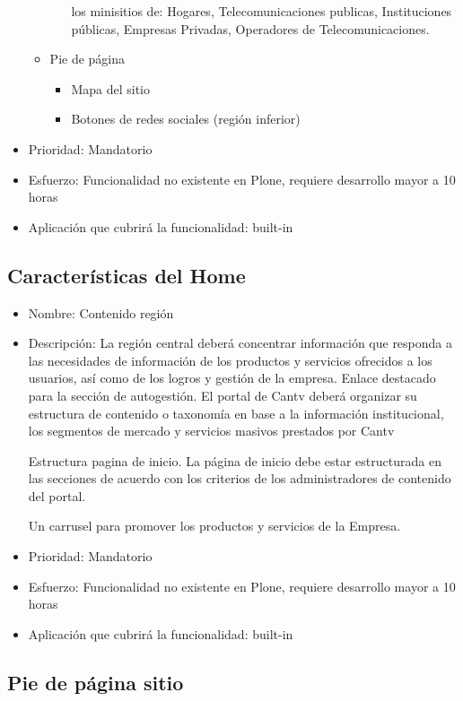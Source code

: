 \documentclass[11pt, letterpaper, oneside, spanish]{scrbook}
\begin{document}
\begin{itemize}
\begin{itemize}
\begin{itemize}
       los minisitios de: Hogares, Telecomunicaciones publicas, Instituciones
       públicas, Empresas Privadas, Operadores de Telecomunicaciones.
\end{itemize}
\item Pie de página
\begin{itemize}
\item Mapa del sitio
\item Botones de redes sociales (región inferior)
\end{itemize}
\end{itemize}
\item Prioridad: Mandatorio
\item Esfuerzo: Funcionalidad no existente en Plone, requiere desarrollo mayor a
  10 horas
\item Aplicación que cubrirá la funcionalidad:  built-in
\end{itemize}
\subsection{Características del Home}
\label{sec-2-1-28}

\begin{itemize}
\item Nombre: Contenido región
\item Descripción: La región central deberá concentrar información que responda a
  las necesidades de información de los productos y servicios ofrecidos a los
  usuarios, así como de los logros y gestión de la empresa.  Enlace destacado
  para la sección de autogestión. El portal de Cantv deberá organizar su
  estructura de contenido o taxonomía en base a la información institucional,
  los segmentos de mercado y servicios masivos prestados por Cantv

  Estructura pagina de inicio. La página de inicio debe estar estructurada en
  las secciones de acuerdo con los criterios de los administradores de
  contenido del portal.

  Un carrusel para promover los productos y servicios de la Empresa.
\item Prioridad: Mandatorio
\item Esfuerzo: Funcionalidad no existente en Plone, requiere desarrollo mayor a
  10 horas
\item Aplicación que cubrirá la funcionalidad:  built-in
\end{itemize}
\subsection{Pie de página sitio}
\label{sec-2-1-29}
\end{document}
